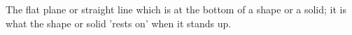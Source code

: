 The flat plane or straight line which is at the bottom of a shape or a solid;
it is what the shape or solid 'rests on' when it stands up.